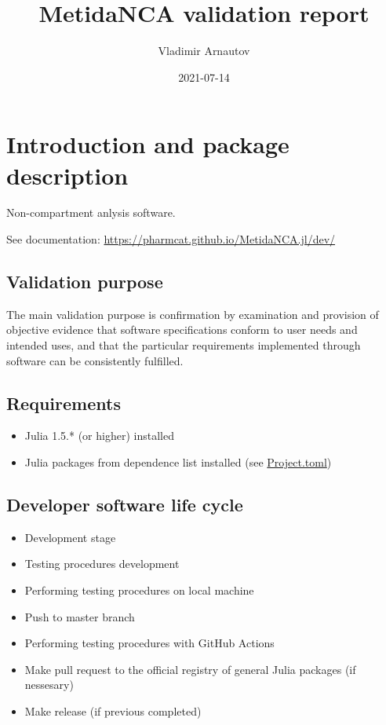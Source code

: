 \documentclass[12pt,a4paper]{article}
\title{ MetidaNCA validation report }
\author{ Vladimir Arnautov }
\date{ 2021-07-14 }
\begin{document}
\maketitle


\section{Introduction and package description}
Non-compartment anlysis software.

See documentation: \href{https://pharmcat.github.io/MetidaNCA.jl/dev/}{https://pharmcat.github.io/MetidaNCA.jl/dev/}

\subsection{Validation purpose}
The main validation purpose is confirmation by examination and provision of objective evidence that software specifications conform to user needs and intended uses, and that the particular requirements implemented through software can be consistently fulfilled.

\subsection{Requirements}
\begin{itemize}
\item Julia 1.5.* (or higher) installed


\item Julia packages from dependence list installed (see \href{https://github.com/PharmCat/MetidaNCA.jl/blob/main/Project.toml}{Project.toml})

\end{itemize}
\subsection{Developer software life cycle}
\begin{itemize}
\item Development stage


\item Testing procedures development


\item Performing testing procedures on local machine


\item Push to master branch


\item Performing testing procedures with GitHub Actions


\item Make pull request to the official registry of general Julia packages (if nessesary)


\item Make release (if previous completed)

\end{itemize}
\end{document}

